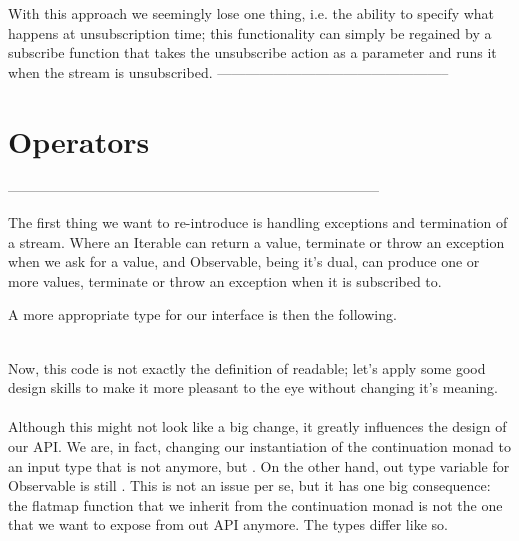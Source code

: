 With this approach we seemingly lose one thing, i.e. the ability to specify what happens at unsubscription time; this functionality can simply be regained by a subscribe function that takes the unsubscribe action as a parameter and runs it when the stream is unsubscribed.
--------------------------------------------------

\section{Operators}
\label{operators}

--------------------------------------------------------------------------------

The first thing we want to re-introduce is handling exceptions and termination of a stream. Where an Iterable can return a value, terminate or throw an exception when we ask for a value, and Observable, being it's dual, can produce one or more values, terminate or throw an exception when it is subscribed to. 

A more appropriate type for our interface is then the following.\\

\\


Now, this code is not exactly the definition of readable; let's apply some good design skills to make it more pleasant to the eye without changing it's meaning.\\

\\

Although this might not look like a big change, it greatly influences the design of our API. We are, in fact, changing our instantiation of the continuation monad to an input type that is not  anymore, but . On the other hand, out type variable for Observable is still . This is not an issue per se, but it has one big consequence: the flatmap function that we inherit from the continuation monad is not the one that we want to expose from out API anymore. The types differ like so.\\

\\

